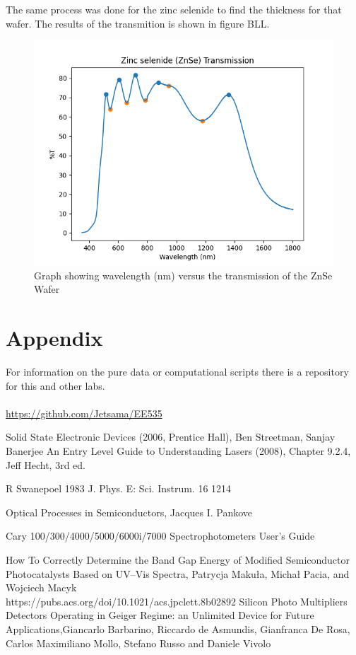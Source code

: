 \documentclass[10pt,a4paper]{article}
\begin{document}
\begin{multicols}{2}
The same process was done for the zinc selenide to find the thickness for that wafer. The results of the transmition is shown in figure BLL.
\begin{figure}[H]
\label{znsetran}
\includegraphics[scale=0.5]{znsetp}
\caption{Graph showing wavelength (nm) versus the transmission of the ZnSe Wafer }
\end{figure}
    

\section*{Appendix}
For information on the pure data or computational scripts there is a repository for this and other labs. \\
\\\href{https://github.com/Jetsama/EE535}{https://github.com/Jetsama/EE535}

\begin{thebibliography}{9}
 Solid State Electronic Devices (2006, Prentice Hall), Ben Streetman, Sanjay Banerjee
An Entry Level Guide to Understanding Lasers (2008), Chapter 9.2.4, Jeff Hecht, 3rd ed. 

R Swanepoel 1983 J. Phys. E: Sci. Instrum. 16 1214

Optical Processes in Semiconductors, Jacques I. Pankove

Cary 100/300/4000/5000/6000i/7000 Spectrophotometers User's Guide

How To Correctly Determine the Band Gap Energy of Modified Semiconductor Photocatalysts Based on UV–Vis Spectra, Patrycja Makuła, Michał Pacia, and Wojciech Macyk\\https://pubs.acs.org/doi/10.1021/acs.jpclett.8b02892
Silicon Photo Multipliers Detectors Operating in Geiger Regime: an Unlimited Device for Future Applications,Giancarlo Barbarino, Riccardo de Asmundis, Gianfranca De Rosa, Carlos Maximiliano Mollo, Stefano Russo and Daniele Vivolo



\end{thebibliography}
\end{multicols}
\end{document}
